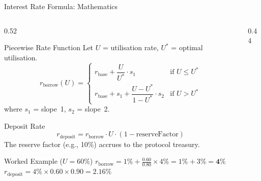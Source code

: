 \documentclass[8pt,aspectratio=169]{beamer}
\begin{document}
\begin{frame}{Interest Rate Formula: Mathematics}
  \begin{columns}[T]
    \begin{column}{0.52\textwidth}
      \begin{block}{Piecewise Rate Function}
        Let $U$ = utilisation rate, $U^*$ = optimal utilisation.
        \[
          r_{\text{borrow}}(U) =
          \begin{cases}
            r_{\text{base}} + \dfrac{U}{U^*} \cdot s_1
              & \text{if } U \leq U^* \\[8pt]
            r_{\text{base}} + s_1 + \dfrac{U - U^*}{1 - U^*} \cdot s_2
              & \text{if } U > U^*
          \end{cases}
        \]
        where $s_1$ = slope~1, $s_2$ = slope~2.
      \end{block}
      \vspace{3mm}
      \begin{block}{Deposit Rate}
        \[
          r_{\text{deposit}} = r_{\text{borrow}} \cdot U \cdot (1 - \text{reserveFactor})
        \]
        The reserve factor (e.g., 10\%) accrues to the protocol treasury.
      \end{block}
      \vspace{3mm}
      \begin{block}{Worked Example ($U = 60\%$)}
        $r_{\text{borrow}} = 1\% + \tfrac{0.60}{0.80} \times 4\% = 1\% + 3\% = \mathbf{4\%}$\\[4pt]
        $r_{\text{deposit}} = 4\% \times 0.60 \times 0.90 = \mathbf{2.16\%}$
      \end{block}
    \end{column}
    \begin{column}{0.44\textwidth}
      \centering
\end{column}
\end{columns}
\end{frame}
\end{document}
